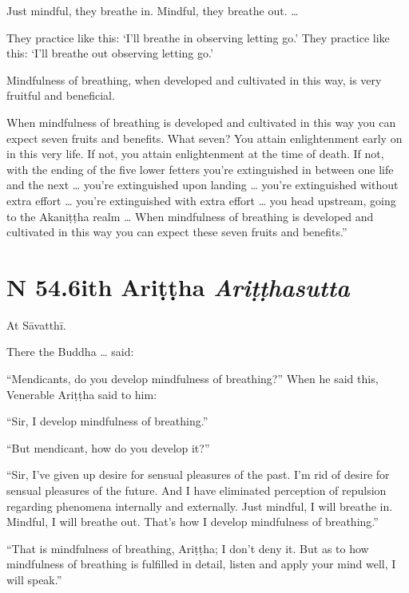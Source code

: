 \documentclass[12pt,openany]{book}%
\newcommand*{\suttatitleacronym}[1]{\smaller[2]{#1}\vspace*{.3em}}
\newcommand*{\suttatitletranslation}[1]{\linebreak{#1}}
\newcommand*{\suttatitleroot}[1]{\linebreak\smaller[2]\itshape{#1}}
\newcommand*{\tocacronym}[1]{\hspace*{-3.3em}{#1}\quad}
\newcommand*{\toctranslation}[1]{#1}
\newcommand*{\tocroot}[1]{(\textit{#1})}
\begin{document}
Just mindful, they breathe in. Mindful, they breathe out. … 

They practice like this: ‘I’ll breathe in observing letting go.’ They practice like this: ‘I’ll breathe out observing letting go.’ 

Mindfulness of breathing, when developed and cultivated in this way, is very fruitful and beneficial. 

When mindfulness of breathing is developed and cultivated in this way you can expect seven fruits and benefits. What seven? You attain enlightenment early on in this very life. If not, you attain enlightenment at the time of death. If not, with the ending of the five lower fetters you’re extinguished in between one life and the next … you’re extinguished upon landing … you’re extinguished without extra effort … you’re extinguished with extra effort … you head upstream, going to the \textsanskrit{Akaniṭṭha} realm … When mindfulness of breathing is developed and cultivated in this way you can expect these seven fruits and benefits.” 

%
\section*{{\suttatitleacronym SN 54.6}{\suttatitletranslation With Ariṭṭha }{\suttatitleroot Ariṭṭhasutta}}
\addcontentsline{toc}{section}{\tocacronym{SN 54.6} \toctranslation{With Ariṭṭha } \tocroot{Ariṭṭhasutta}}

At \textsanskrit{Sāvatthī}. 

There the Buddha … said: 

“Mendicants, do you develop mindfulness of breathing?” When he said this, Venerable \textsanskrit{Ariṭṭha} said to him: 

“Sir, I develop mindfulness of breathing.” 

“But mendicant, how do you develop it?” 

“Sir, I’ve given up desire for sensual pleasures of the past. I’m rid of desire for sensual pleasures of the future. And I have eliminated perception of repulsion regarding phenomena internally and externally. Just mindful, I will breathe in. Mindful, I will breathe out. That’s how I develop mindfulness of breathing.” 

“That is mindfulness of breathing, \textsanskrit{Ariṭṭha}; I don’t deny it. But as to how mindfulness of breathing is fulfilled in detail, listen and apply your mind well, I will speak.” 
\end{document}
